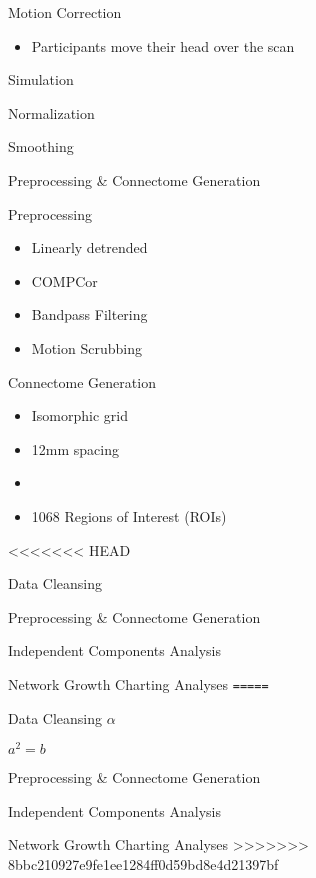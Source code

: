 \documentclass[presentation]{beamer}
\begin{document}
\begin{frame}[fragile,label={sec:orgheadline10}]{Motion Correction}
 \begin{itemize}
\item Participants move their head over the scan
\end{itemize}
\begin{block}{Simulation}
\end{block}
\begin{block}{Normalization}
\end{block}
\begin{block}{Smoothing}
\end{block}

\begin{block}{Preprocessing \& Connectome Generation}
\begin{block}{Preprocessing}
\begin{itemize}
\item Linearly detrended
\item COMPCor
\item Bandpass Filtering
\item Motion Scrubbing
\end{itemize}
\end{block}
\begin{block}{Connectome Generation}
\begin{itemize}
\item Isomorphic grid
\item 12mm spacing
\item 

\item 1068 Regions of Interest (ROIs)
\end{itemize}
<<<<<<< HEAD
\end{block}
\end{block}
\begin{block}{Data Cleansing}
\end{block}
\begin{block}{Preprocessing \& Connectome Generation}
\end{block}
\begin{block}{Independent Components Analysis}
\end{block}
\begin{block}{Network Growth Charting Analyses}
\texttt{=====}
\end{block}
\end{frame}
\begin{frame}[label={sec:orgheadline11}]{Data Cleansing}
\(\alpha\)

\(a^2=b\)
\end{frame}
\begin{frame}[label={sec:orgheadline12}]{Preprocessing \& Connectome Generation}
\end{frame}
\begin{frame}[label={sec:orgheadline13}]{Independent Components Analysis}
\end{frame}
\begin{frame}[label={sec:orgheadline14}]{Network Growth Charting Analyses}
>>>>>>> 8bbc210927e9fe1ee1284ff0d59bd8e4d21397bf
\end{frame}
\end{document}
